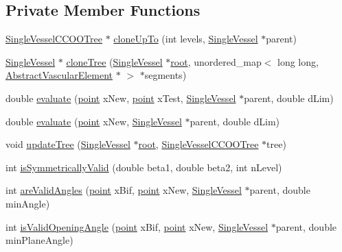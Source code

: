 \subsection*{Private Member Functions}
\begin{DoxyCompactItemize}
\item 
\hyperlink{class_single_vessel_c_c_o_o_tree}{Single\+Vessel\+C\+C\+O\+O\+Tree} $\ast$ \hyperlink{class_single_vessel_c_c_o_o_tree_afcabe5e4cb15ffdb18097c28ecc72e44}{clone\+Up\+To} (int levels, \hyperlink{class_single_vessel}{Single\+Vessel} $\ast$parent)
\item 
\hyperlink{class_single_vessel}{Single\+Vessel} $\ast$ \hyperlink{class_single_vessel_c_c_o_o_tree_a8fc66762911652eec13b986a69b60e08}{clone\+Tree} (\hyperlink{class_single_vessel}{Single\+Vessel} $\ast$\hyperlink{class_abstract_object_c_c_o_tree_ae1b17938ad34d92629915159c49bb89a}{root}, unordered\+\_\+map$<$ long long, \hyperlink{class_abstract_vascular_element}{Abstract\+Vascular\+Element} $\ast$ $>$ $\ast$segments)
\item 
double \hyperlink{class_single_vessel_c_c_o_o_tree_ac0580b83043a18855988071a2a3f4913}{evaluate} (\hyperlink{structpoint}{point} x\+New, \hyperlink{structpoint}{point} x\+Test, \hyperlink{class_single_vessel}{Single\+Vessel} $\ast$parent, double d\+Lim)
\item 
double \hyperlink{class_single_vessel_c_c_o_o_tree_a154064bf9792abee19671f39c851eb25}{evaluate} (\hyperlink{structpoint}{point} x\+New, \hyperlink{class_single_vessel}{Single\+Vessel} $\ast$parent, double d\+Lim)
\item 
void \hyperlink{class_single_vessel_c_c_o_o_tree_ac8d4ca178e13ed388ad5fe0411ca0b75}{update\+Tree} (\hyperlink{class_single_vessel}{Single\+Vessel} $\ast$\hyperlink{class_abstract_object_c_c_o_tree_ae1b17938ad34d92629915159c49bb89a}{root}, \hyperlink{class_single_vessel_c_c_o_o_tree}{Single\+Vessel\+C\+C\+O\+O\+Tree} $\ast$tree)
\item 
int \hyperlink{class_single_vessel_c_c_o_o_tree_a83661a533a356d3631696b32dee89632}{is\+Symmetrically\+Valid} (double beta1, double beta2, int n\+Level)
\item 
int \hyperlink{class_single_vessel_c_c_o_o_tree_aaf5664ee98d5c6b4b4c0c01a9921a80d}{are\+Valid\+Angles} (\hyperlink{structpoint}{point} x\+Bif, \hyperlink{structpoint}{point} x\+New, \hyperlink{class_single_vessel}{Single\+Vessel} $\ast$parent, double min\+Angle)
\item 
int \hyperlink{class_single_vessel_c_c_o_o_tree_a6c97600f94db54a0df9146880dd601ee}{is\+Valid\+Opening\+Angle} (\hyperlink{structpoint}{point} x\+Bif, \hyperlink{structpoint}{point} x\+New, \hyperlink{class_single_vessel}{Single\+Vessel} $\ast$parent, double min\+Plane\+Angle)

\end{DoxyCompactItemize}
